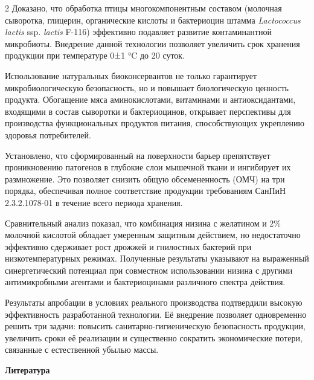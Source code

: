 \begin{multicols}{2}
Доказано, что обработка птицы многокомпонентным составом (молочная
сыворотка, глицерин, органические кислоты и бактериоцин штамма
\emph{Lactococcus lactis} ssp. \emph{lactis} F-116) эффективно подавляет
развитие контаминантной микробиоты. Внедрение данной технологии
позволяет увеличить срок хранения продукции при температуре 0±1 °C до 20
суток.

Использование натуральных биоконсервантов не только гарантирует
микробиологическую безопасность, но и повышает биологическую ценность
продукта. Обогащение мяса аминокислотами, витаминами и антиоксидантами,
входящими в состав сыворотки и бактериоцинов, открывает перспективы для
производства функциональных продуктов питания, способствующих укреплению
здоровья потребителей.

Установлено, что сформированный на поверхности барьер препятствует
проникновению патогенов в глубокие слои мышечной ткани и ингибирует их
размножение. Это позволяет снизить общую обсемененность (ОМЧ) на три
порядка, обеспечивая полное соответствие продукции требованиям СанПиН
2.3.2.1078-01 в течение всего периода хранения.

Сравнительный анализ показал, что комбинация низина с желатином и 2\%
молочной кислотой обладает умеренным защитным действием, но недостаточно
эффективно сдерживает рост дрожжей и гнилостных бактерий при
низкотемпературных режимах. Полученные результаты указывают на
выраженный синергетический потенциал при совместном использовании низина
с другими антимикробными агентами и бактериоцинами различного спектра
действия.

Результаты апробации в условиях реального производства подтвердили
высокую эффективность разработанной технологии. Её внедрение позволяет
одновременно решить три задачи: повысить санитарно-гигиеническую
безопасность продукции, увеличить сроки её реализации и существенно
сократить экономические потери, связанные с естественной убылью массы.
\end{multicols}

\begin{center}
{\bfseries Литература}
\end{center}

